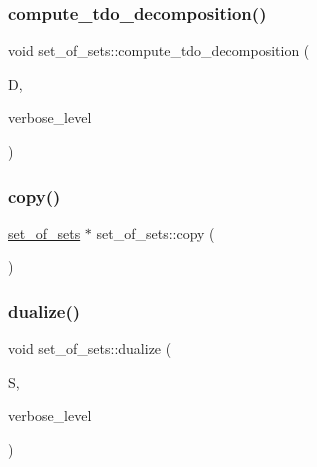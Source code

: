 \subsubsection{\texorpdfstring{compute\+\_\+tdo\+\_\+decomposition()}{compute\_tdo\_decomposition()}}
{\footnotesize\ttfamily void set\+\_\+of\+\_\+sets\+::compute\+\_\+tdo\+\_\+decomposition (\begin{DoxyParamCaption}\item[{\mbox{\hyperlink{classdecomposition}{decomposition}} \&}]{D,  }\item[{\mbox{\hyperlink{galois_8h_a09fddde158a3a20bd2dcadb609de11dc}{I\+NT}}}]{verbose\+\_\+level }\end{DoxyParamCaption})}

\mbox{\label{classset__of__sets_aebe21c52c36edd9b2439f3e0c9c3f333}} 
\subsubsection{\texorpdfstring{copy()}{copy()}}
{\footnotesize\ttfamily \mbox{\hyperlink{classset__of__sets}{set\+\_\+of\+\_\+sets}} $\ast$ set\+\_\+of\+\_\+sets\+::copy (\begin{DoxyParamCaption}{ }\end{DoxyParamCaption})}

\mbox{\label{classset__of__sets_adc842e32ff036a78e0b86e68f92759e1}} 
\subsubsection{\texorpdfstring{dualize()}{dualize()}}
{\footnotesize\ttfamily void set\+\_\+of\+\_\+sets\+::dualize (\begin{DoxyParamCaption}\item[{\mbox{\hyperlink{classset__of__sets}{set\+\_\+of\+\_\+sets}} $\ast$\&}]{S,  }\item[{\mbox{\hyperlink{galois_8h_a09fddde158a3a20bd2dcadb609de11dc}{I\+NT}}}]{verbose\+\_\+level }\end{DoxyParamCaption})}

\mbox{\label{classset__of__sets_a34da967641e2ffb410328da3c70b9fd1}} 
